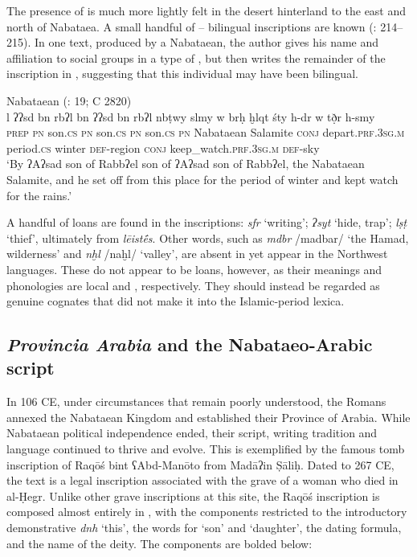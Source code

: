 \documentclass[output=paper]{langsci/langscibook}
\begin{document}
The presence of  is much more lightly felt in the desert hinterland to the east and north of Nabataea. A small handful of -- bilingual inscriptions are known (\citealt{Hayajneh2009}: 214--215). In one  text, produced by a Nabataean, the author gives his name and affiliation to social groups in a type of , but then writes the remainder of the inscription in  , suggesting that this individual may have been bilingual. 

\ea Nabataean  (\citealt{Al-Jallad2015Safaitic}: 19; C 2820) \\ 
\gll l ʔʔsd bn rbʔl bn ʔʔsd bn rbʔl nbṭwy slmy w brḥ ḫlqt śty h-dr w tð̣r h-smy \\
\textsc{prep} \textsc{pn} son.\textsc{cs} \textsc{pn} son.\textsc{cs} \textsc{pn} son.\textsc{cs} \textsc{pn} Nabataean Salamite \textsc{conj} depart.\textsc{prf.3sg.m} period.\textsc{cs} winter \textsc{def}-region \textsc{conj} keep\_watch.\textsc{prf.3sg.m} \textsc{def}-sky \\
\glt `By ʔAʔsad son of Rabbʔel son of  ʔAʔsad son of Rabbʔel, the Nabataean Salamite, and he set off from this place for the period of winter and kept watch for the rains.' \\
\z

A handful of  loans are found in the  inscriptions: \textit{sfr} ‘writing’; \textit{ʔsyt} ‘hide, trap’; \textit{lṣṭ} ‘thief’, ultimately from  \textit{lēistḗs}. Other words, such as \textit{mdbr} /madbar/ ‘the Hamad, wilderness’ and \textit{nḫl} /naḫl/ ‘valley’, are absent in   yet appear in the Northwest  languages. These do not appear to be loans, however, as their meanings and phonologies are local and , respectively. They should instead be regarded as genuine cognates that did not make it into the Islamic-period lexica. 

\subsection{\textit{Provincia Arabia} and the Nabataeo-Arabic script}\label{Provincia}
In 106 CE, under circumstances that remain poorly understood, the Romans annexed the Nabataean Kingdom and established their Province of Arabia. While Nabataean political independence ended, their script, writing tradition and language continued to thrive and evolve. This is exemplified by the famous tomb inscription of Raqōś bint ʕAbd-Manōto from Madāʔin Ṣāliḥ. Dated to 267 CE, the text is a legal inscription associated with the grave of a woman who died in al-Ḥegr. Unlike other grave inscriptions at this site, the Raqōś inscription is composed almost entirely in , with the  components restricted to the introductory demonstrative \textit{dnh} ‘this’, the words for ‘son’ and ‘daughter’, the dating formula, and the name of the deity. The  components are bolded below:
\end{document}
